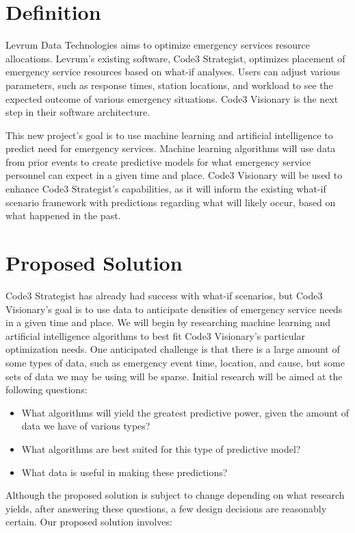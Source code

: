 \documentclass[onecolumn, draftclsnofoot,10pt, compsoc]{IEEEtran}
\begin{document}
\section{Definition}
Levrum Data Technologies aims to optimize emergency services resource allocations.
Levrum's existing software, Code3 Strategist, optimizes placement of emergency service resources based on what-if analyses.
Users can adjust various parameters, such as response times, station locations, and workload to see the expected outcome of various emergency situations.
Code3 Visionary is the next step in their software architecture. \par
This new project's goal is to use machine learning and artificial intelligence to predict need for emergency services.
Machine learning algorithms will use data from prior events to create predictive models for what emergency service personnel can expect in a given time and place.
Code3 Visionary will be used to enhance Code3 Strategist's capabilities, as it will inform the existing what-if scenario framework with predictions regarding what will likely occur, based on what happened in the past.

\section{Proposed Solution}
 Code3 Strategist has already had success with what-if scenarios, but Code3 Visionary's goal is to use data to anticipate densities of emergency service needs in a given time and place. We will begin by researching machine learning and artificial intelligence algorithms to best fit Code3 Visionary's particular optimization needs. One anticipated challenge is that there is a large amount of some types of data, such as emergency event time, location, and cause, but some sets of data we may be using will be sparse.
Initial research will be aimed at the following questions:
\begin{itemize}
    \item What algorithms will yield the greatest predictive power, given the amount of data we have of various types?
    \item What algorithms are best suited for this type of predictive model?
    \item What data is useful in making these predictions?
\end{itemize}
Although the proposed solution is subject to change depending on what research yields, after answering these questions, a few design decisions are reasonably certain. Our proposed solution involves:
\end{document}
